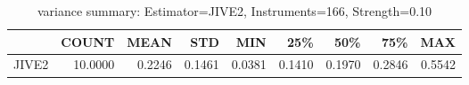 \begin{table}[ht]
\centering
\caption{variance summary: Estimator=JIVE2, Instruments=166, Strength=0.10}
\begin{tabular}{lrrrrrrrr}
\toprule
 & COUNT & MEAN & STD & MIN & 25\% & 50\% & 75\% & MAX \\
\midrule
JIVE2 & 10.0000 & 0.2246 & 0.1461 & 0.0381 & 0.1410 & 0.1970 & 0.2846 & 0.5542 \\
\bottomrule
\end{tabular}
\end{table}

